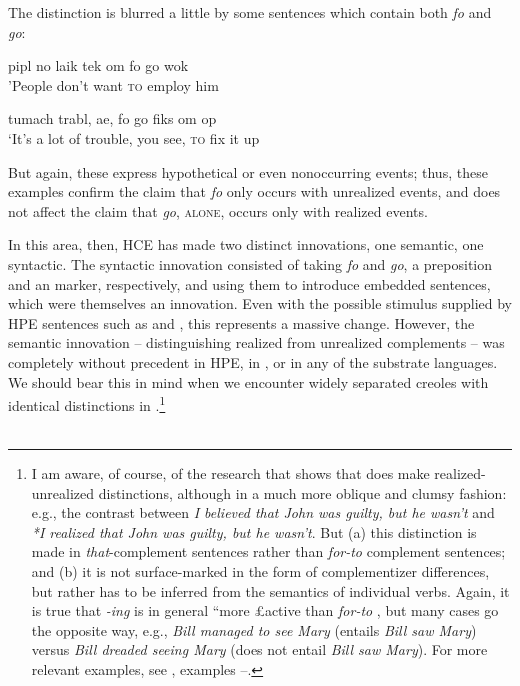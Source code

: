 The distinction is blurred a little by some sentences which contain both \textit{fo} and \textit{go}:

\ea\label{ex:67}
 pipl no laik tek om fo go wok\\
\glt  'People don't want \textsc{to} employ him
\z

\ea\label{ex:68}
 tumach trabl, ae, fo go fiks om op \\
\glt  `It's a lot of trouble, you see, \textsc{to} fix it up
\z

\noindent But again, these  express hypothetical or even nonoccur\-ring events; thus, these examples confirm the claim that \textit{fo} only occurs with unrealized events, and does not affect the claim that \textit{go}, \textsc{alone}, occurs only with realized events.

In this area, then, HCE has made two distinct innovations, one semantic, one syntactic. The syntactic innovation consisted of taking \textit{fo} and \textit{go}, a preposition and an  marker, respectively, and using them to introduce embedded sentences, which were themselves an innovation. Even with the possible stimulus supplied by HPE sen\-tences such as  and , this represents a massive change. However, the semantic innovation -- distinguishing realized from unrealized com\-plements -- was completely without precedent in HPE, in , or in any of the substrate languages. We should bear this in mind when we encounter widely separated creoles with identical distinctions in .\footnote{I am aware, of course, of the research that shows that  does make realized-unrealized distinctions, although in a much more oblique and clumsy fashion: e.g., the contrast between \textit{I believed that John was guilty, but he wasn't} and \textit{*I realized that John was guilty,  but he wasn't}. But (a) this distinction is made in \textit{that}-complement sentences rather than \textit{for-to} complement sentences; and (b) it is not surface-marked in the form of complementizer differences, but rather has to be inferred from the semantics of individual verbs. Again, it is true that \textit{-ing}  is in general ``more £active than \textit{for-to} , but many cases go the opposite way, e.g., \textit{Bill managed to see Mary} (entails \textit{Bill saw Mary}) versus \textit{Bill dreaded seeing Mary} (does not entail \textit{Bill saw Mary}). For more relevant exam\-ples, see , examples --.}\\\\


